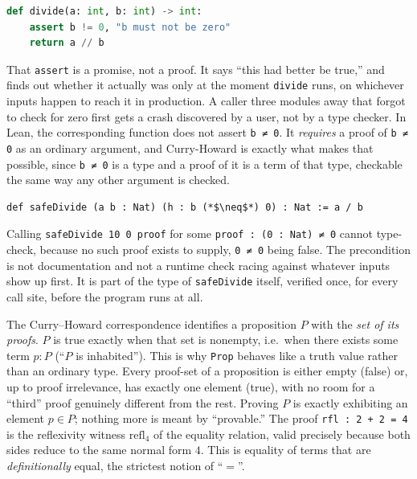 \begin{lstlisting}[language=Python,style=python]
def divide(a: int, b: int) -> int:
    assert b != 0, "b must not be zero"
    return a // b
\end{lstlisting}

That \texttt{assert} is a promise, not a proof. It says ``this had better be true,'' and finds out whether it actually was only at the moment \texttt{divide} runs, on whichever inputs happen to reach it in production. A caller three modules away that forgot to check for zero first gets a crash discovered by a user, not by a type checker. In Lean, the corresponding function does not assert \texttt{b ≠ 0}. It \emph{requires} a proof of \texttt{b ≠ 0} as an ordinary argument, and Curry-Howard is exactly what makes that possible, since \texttt{b ≠ 0} is a type and a proof of it is a term of that type, checkable the same way any other argument is checked.

\begin{lstlisting}
def safeDivide (a b : Nat) (h : b (*$\neq$*) 0) : Nat := a / b
\end{lstlisting}

Calling \texttt{safeDivide 10 0 proof} for some \texttt{proof : (0 : Nat) ≠ 0} cannot type-check, because no such proof exists to supply, \texttt{0 ≠ 0} being false. The precondition is not documentation and not a runtime check racing against whatever inputs show up first. It is part of the type of \texttt{safeDivide} itself, verified once, for every call site, before the program runs at all.

\begin{mathreading}

The Curry--Howard correspondence identifies a proposition \(P\) with the \emph{set of its proofs}. \(P\) is true exactly when that set is nonempty, i.e.~when there exists some term \(p : P\) (``\(P\) is inhabited''). This is why \texttt{Prop} behaves like a truth value rather than an ordinary type. Every proof-set of a proposition is either empty (false) or, up to proof irrelevance, has exactly one element (true), with no room for a ``third'' proof genuinely different from the rest. Proving \(P\) is exactly exhibiting an element \(p \in P\); nothing more is meant by ``provable.'' The proof \texttt{rfl : 2 + 2 = 4} is the reflexivity witness \(\mathrm{refl}_4\) of the equality relation, valid precisely because both sides reduce to the same normal form \(4\). This is equality of terms that are \emph{definitionally} equal, the strictest notion of ``\(=\)''.

\end{mathreading}

